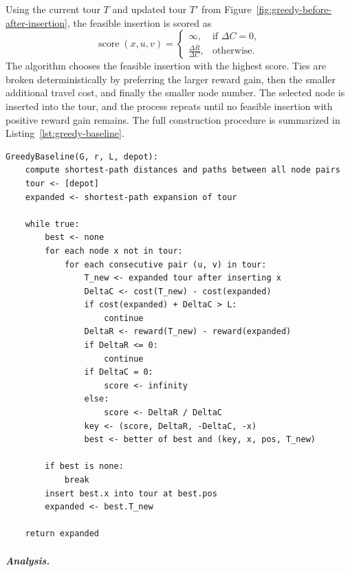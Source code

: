 \documentclass[report,english,cleveref,autoref,a4paper]{lipics-v2021}
\begin{document}
Using the current tour $T$ and updated tour $T'$ from
Figure~\ref{fig:greedy-before-after-insertion}, the feasible insertion is scored
as
\[
  \operatorname{score}(x,u,v) =
  \begin{cases}
    \infty, & \text{if } \Delta C = 0,\\
    \frac{\Delta R}{\Delta C}, & \text{otherwise.}
  \end{cases}
\]
The algorithm chooses the feasible insertion with the highest score. Ties are
broken deterministically by preferring the larger reward gain, then the smaller
additional travel cost, and finally the smaller node number. The selected node
is inserted into the tour, and the process repeats until no feasible insertion
with positive reward gain remains. The full construction procedure is summarized
in Listing~\ref{lst:greedy-baseline}.

\begin{lstlisting}[caption={Greedy Baseline construction procedure.},label={lst:greedy-baseline},mathescape=true]
GreedyBaseline(G, r, L, depot):
    compute shortest-path distances and paths between all node pairs
    tour <- [depot]
    expanded <- shortest-path expansion of tour

    while true:
        best <- none
        for each node x not in tour:
            for each consecutive pair (u, v) in tour:
                T_new <- expanded tour after inserting x
                DeltaC <- cost(T_new) - cost(expanded)
                if cost(expanded) + DeltaC > L:
                    continue
                DeltaR <- reward(T_new) - reward(expanded)
                if DeltaR <= 0:
                    continue
                if DeltaC = 0:
                    score <- infinity
                else:
                    score <- DeltaR / DeltaC
                key <- (score, DeltaR, -DeltaC, -x)
                best <- better of best and (key, x, pos, T_new)

        if best is none:
            break
        insert best.x into tour at best.pos
        expanded <- best.T_new

    return expanded
\end{lstlisting}

\subparagraph{Analysis.}
\end{document}

